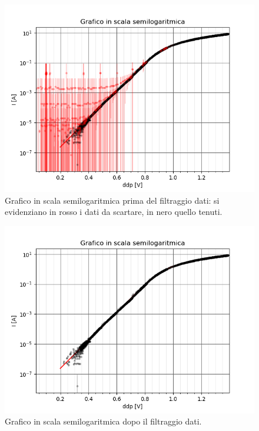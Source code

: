 \documentclass{article}[a4paper, oneside, 11pt]
\begin{document}
\begin{figure}[!htb]
	\centering 
 		\includegraphics[scale=0.9]{./nofilter.pdf}
	\caption{Grafico in scala semilogaritmica prima del filtraggio dati:
	si evidenziano in rosso i dati da scartare, in nero quello tenuti.
	\label{fig: nofilter}}
\end{figure}
\begin{figure}[!htb]
	\centering 
 		\includegraphics[scale=0.9]{./filtered.pdf}
 	\caption{Grafico in scala semilogaritmica dopo il filtraggio dati.
	\label{fig: filtered}}
\end{figure}
\end{document}
